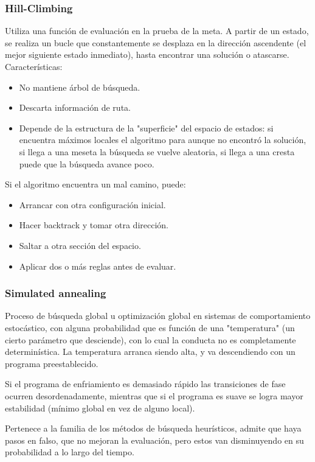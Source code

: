 \begin{description}
\begin{enumerate}
\subsubsection{Hill-Climbing}
Utiliza una función de evaluación en la prueba de la meta. A partir de un
estado, se realiza un bucle que constantemente se desplaza en la dirección
ascendente (el mejor siguiente estado inmediato), hasta encontrar una
solución o atascarse. Características:
\begin{itemize}
    \item No mantiene árbol de búsqueda.
    \item Descarta información de ruta.
    \item Depende de la estructura de la "superficie" del espacio de
    estados: si encuentra máximos locales el algoritmo para aunque no
    encontró la solución, si llega a una meseta la búsqueda se vuelve
    aleatoria, si llega a una cresta puede que la búsqueda avance poco.
\end{itemize}
Si el algoritmo encuentra un mal camino, puede:
\begin{itemize}
    \item Arrancar con otra configuración inicial.
    \item Hacer backtrack y tomar otra dirección.
    \item Saltar a otra sección del espacio.
    \item Aplicar dos o más reglas antes de evaluar.
\end{itemize}

\subsubsection{Simulated annealing}
Proceso de búsqueda global u optimización global en sistemas de
comportamiento estocástico, con alguna probabilidad que es función
de una "temperatura" (un cierto parámetro que desciende), con lo cual
la conducta no es completamente determinística. La temperatura arranca
siendo alta, y va descendiendo con un programa preestablecido.

Si el programa de enfriamiento es demasiado rápido las transiciones
de fase ocurren desordenadamente, mientras que si el programa es suave
se logra mayor estabilidad (mínimo global en vez de alguno local).

Pertenece a la familia de los métodos de búsqueda heurísticos, admite
que haya pasos en falso, que no mejoran la evaluación, pero estos van
disminuyendo en su probabilidad a lo largo del tiempo.


\end{enumerate}
\end{description}

